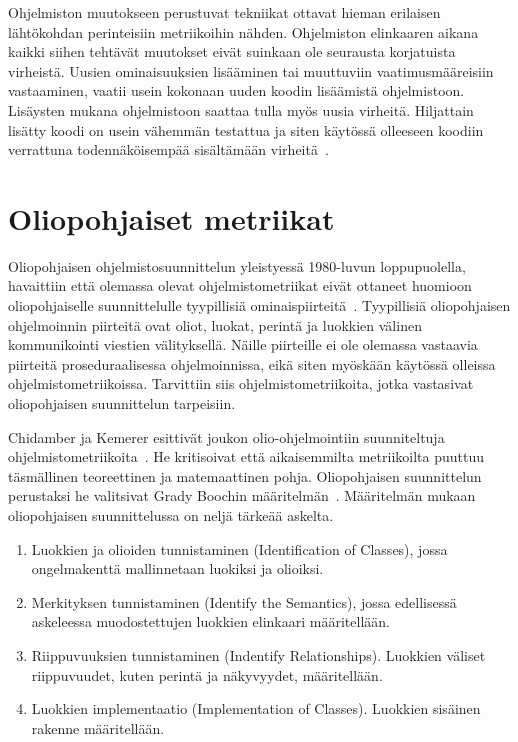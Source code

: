 \documentclass[finnish]{tktltiki2}
\theoremstyle{definition}
\theoremstyle{remark}
\begin{document}
Ohjelmiston muutokseen perustuvat tekniikat ottavat hieman erilaisen lähtökohdan perinteisiin metriikoihin nähden. Ohjelmiston elinkaaren aikana kaikki siihen tehtävät muutokset eivät suinkaan ole seurausta korjatuista virheistä. Uusien ominaisuuksien lisääminen tai muuttuviin vaatimusmääreisiin vastaaminen, vaatii usein kokonaan uuden koodin lisäämistä ohjelmistoon. Lisäysten mukana ohjelmistoon saattaa tulla myös uusia virheitä. Hiljattain lisätty koodi on usein vähemmän testattua ja siten käytössä olleeseen koodiin verrattuna todennäköisempää sisältämään virheitä~\cite{ME98}.



\section{Oliopohjaiset metriikat}

Oliopohjaisen ohjelmistosuunnittelun yleistyessä 1980-luvun loppupuolella, havaittiin että olemassa olevat ohjelmistometriikat eivät ottaneet huomioon oliopohjaiselle suunnittelulle tyypillisiä ominaispiirteitä~\cite{LH93, CK94}. Tyypillisiä oliopohjaisen ohjelmoinnin piirteitä ovat oliot, luokat, perintä ja luokkien välinen kommunikointi viestien välityksellä. Näille piirteille ei ole olemassa vastaavia piirteitä proseduraalisessa ohjelmoinnissa, eikä siten myöskään käytössä olleissa ohjelmistometriikoissa. Tarvittiin siis ohjelmistometriikoita, jotka vastasivat oliopohjaisen suunnittelun tarpeisiin.

Chidamber ja Kemerer esittivät joukon olio-ohjelmointiin suunniteltuja ohjelmistometriikoita~\cite{CK91, CK94}. He kritisoivat että aikaisemmilta metriikoilta puuttuu täsmällinen teoreettinen ja matemaattinen pohja. Oliopohjaisen suunnittelun perustaksi he valitsivat Grady Boochin määritelmän~\cite{B94}. Määritelmän mukaan oliopohjaisen suunnittelussa on neljä tärkeää askelta.
\begin{enumerate}
    \item Luokkien ja olioiden tunnistaminen (Identification of Classes), jossa ongelmakenttä mallinnetaan luokiksi ja olioiksi.
    \item Merkityksen tunnistaminen (Identify the Semantics), jossa edellisessä askeleessa muodostettujen luokkien elinkaari määritellään.
    \item Riippuvuuksien tunnistaminen (Indentify Relationships). Luokkien väliset riippuvuudet, kuten perintä ja näkyvyydet, määritellään.
    \item Luokkien implementaatio (Implementation of Classes). Luokkien sisäinen rakenne määritellään.
\end{enumerate}
\end{document}
